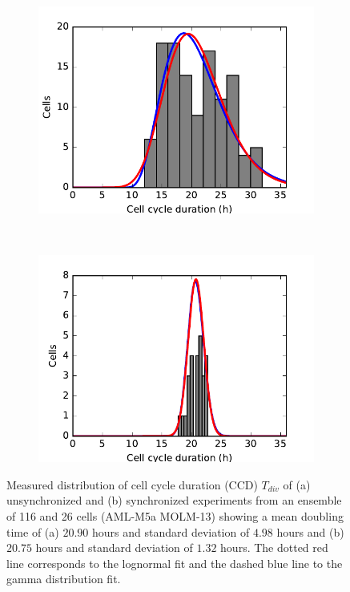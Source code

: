 \documentclass[pdftex,12pt,a4paper]{report}
\begin{document}
\begin{figure}[H]
\centering
\begin{subfigure}{.48\textwidth}
  \centering
  \includegraphics[width=\textwidth]{images/unsyn_cell_cycle_length_control.pdf}
  \caption{}
  \label{fig:ccd_unsyn}
\end{subfigure}
~
\begin{subfigure}{.48\textwidth}
  \centering
  \includegraphics[width=\textwidth]{images/syn_cell_cycle_length_control.pdf}
  \caption{}
  \label{fig:ccd_syn}
\end{subfigure}
\caption[Measured distribution of CCD in the synchronized and unsynchronized experiments]{Measured distribution of cell cycle duration (CCD) $T_{div}$ of (a) unsynchronized and (b) synchronized experiments from an ensemble of 116 and 26 cells (AML-M5a MOLM-13) showing a mean doubling time of (a) $20.90$ hours and standard deviation of $4.98$ hours and (b) $20.75$ hours and standard deviation of $1.32$ hours. The dotted red line corresponds to the lognormal fit and the dashed blue line to the gamma distribution fit.}
\label{fig:ccd_all}
\end{figure}
\end{document}
